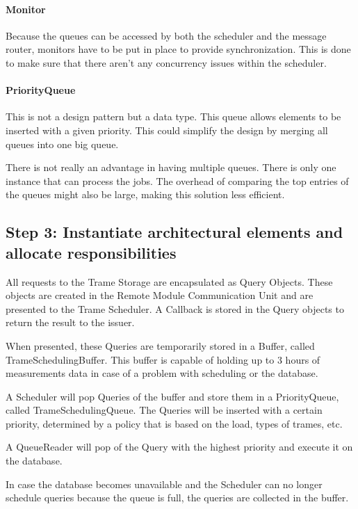 \paragraph{Monitor} 

\npar Because the queues can be accessed by both the scheduler and the message
router, monitors have to be put in place to provide synchronization. This is
done to make sure that there aren't any concurrency issues within the scheduler. 

\paragraph{PriorityQueue}

\npar This is not a design pattern but a data type. This queue allows elements
to be inserted with a given priority. This could simplify the design by merging
all queues into one big queue.

\npar There is not really an advantage in having multiple queues. There is only
one instance that can process the jobs. The overhead of comparing the top
entries of the queues might also be large, making this solution less efficient. 

\subsection{Step 3: Instantiate architectural elements and allocate responsibilities}
\label{add:it3/elements}

\npar All requests to the Trame Storage are encapsulated as Query Objects. These
objects are created in the Remote Module Communication Unit and are presented to
the Trame Scheduler. A Callback is stored in the Query objects to return the
result to the issuer. 

\npar When presented, these Queries are temporarily stored in a Buffer, called
TrameSchedulingBuffer. This buffer is capable of holding up to 3 hours of
measurements data in case of a problem with scheduling or the database. 

\npar A Scheduler will pop Queries of the buffer and store them in a
PriorityQueue, called TrameSchedulingQueue. The Queries will be inserted with a
certain priority, determined by a policy that is based on the load, types of
trames, etc.

\npar A QueueReader will pop of the Query with the highest priority and execute
it on the database. 

\npar In case the database becomes unavailable and the Scheduler can no longer
schedule queries because the queue is full, the queries are collected in the
buffer.

